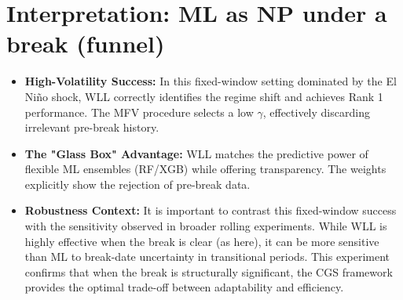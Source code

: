 \documentclass[11pt]{article}
\begin{document}
\section{Interpretation: ML as NP under a break (funnel)}
\begin{itemize}
  \item \textbf{High-Volatility Success:} In this fixed-window setting dominated by the El Ni\~no shock, WLL correctly identifies the regime shift and achieves Rank 1 performance. The MFV procedure selects a low $\gamma$, effectively discarding irrelevant pre-break history.
  \item \textbf{The "Glass Box" Advantage:} WLL matches the predictive power of flexible ML ensembles (RF/XGB) while offering transparency. The weights explicitly show the rejection of pre-break data.
  \item \textbf{Robustness Context:} It is important to contrast this fixed-window success with the sensitivity observed in broader rolling experiments. While WLL is highly effective when the break is clear (as here), it can be more sensitive than ML to break-date uncertainty in transitional periods. This experiment confirms that when the break is structurally significant, the CGS framework provides the optimal trade-off between adaptability and efficiency.
\end{itemize}
\end{document}
